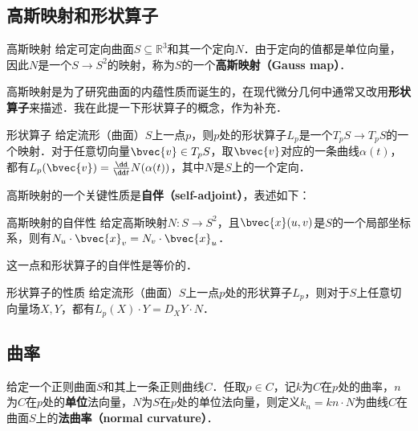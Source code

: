 
\subsection{高斯映射和形状算子}
\begin{definition}{高斯映射}
给定可定向曲面$S\subseteq\mathbb{R}^3$和其一个定向$N$．由于定向的值都是单位向量，因此$N$是一个$S\to S^2$的映射，称为$S$的一个\textbf{高斯映射（Gauss map）}．
\end{definition}

高斯映射是为了研究曲面的内蕴性质而诞生的，在现代微分几何中通常又改用\textbf{形状算子}来描述．我在此提一下形状算子的概念，作为补充．

\begin{definition}{形状算子}
给定流形（曲面）$S$上一点$p$，则$p$处的形状算子$L_p$是一个$T_pS\to T_pS$的一个映射．对于任意切向量$\bvec{v}\in T_pS$，取$\bvec{v}$对应的一条曲线$\alpha(t)$，都有$L_p(\bvec{v})=\frac{\dd}{\dd t}N(\alpha(t))$，其中$N$是$S$上的一个定向．
\end{definition}


高斯映射的一个关键性质是\textbf{自伴（self-adjoint）}，表述如下：

\begin{theorem}{高斯映射的自伴性}
给定高斯映射$N:S\to S^2$，且$\bvec{x}(u, v)$是$S$的一个局部坐标系，则有$N_u\cdot \bvec{x}_v=N_v\cdot \bvec{x}_u$．
\end{theorem}

这一点和形状算子的自伴性是等价的．

\begin{theorem}{形状算子的性质}
给定流形（曲面）$S$上一点$p$处的形状算子$L_p$，则对于$S$上任意切向量场$X, Y$，都有$L_p(X)\cdot Y=D_XY\cdot N$．
\end{theorem}

\subsection{曲率}

\begin{definition}{}
给定一个正则曲面$S$和其上一条正则曲线$C$．任取$p\in C$，记$k$为$C$在$p$处的曲率，$n$为$C$在$p$处的\textbf{单位}法向量，$N$为$S$在$p$处的单位法向量，则定义$k_n=kn\cdot N$为曲线$C$在曲面$S$上的\textbf{法曲率（normal curvature）}．
\end{definition}

